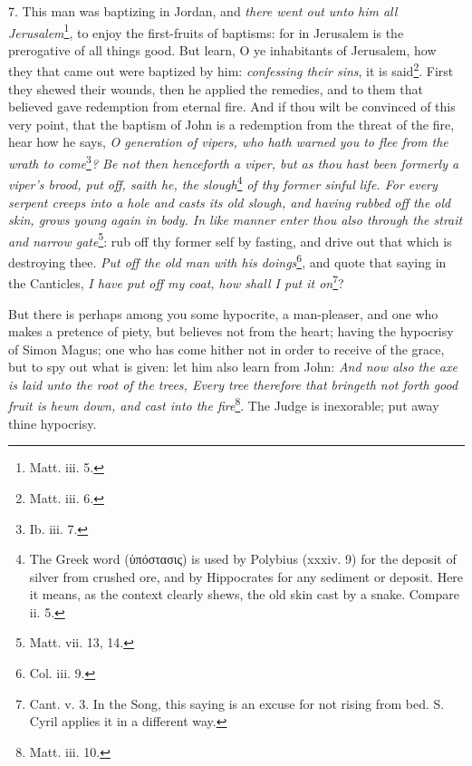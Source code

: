 7. This man was baptizing in Jordan, and \emph{there went out unto him all Jerusalem}\footnote{Matt. iii. 5.}, to enjoy the first-fruits of baptisms: for in Jerusalem is the prerogative of all things good. But learn, O ye inhabitants of Jerusalem, how they that came out were baptized by him: \emph{confessing their sins}, it is said\footnote{Matt. iii. 6.}. First they shewed their wounds, then he applied the remedies, and to them that believed gave redemption from eternal fire. And if thou wilt be convinced of this very point, that the baptism of John is a redemption from the threat of the fire, hear how he says, \emph{O generation of vipers, who hath warned you to flee from the wrath to come}\footnote{Ib. iii. 7.}\emph{? Be not then henceforth a viper, but as thou hast been formerly a viper’s brood, put off, saith he, the slough}\footnote{The Greek word (\textgreek{ὑπόστασις}) is used by Polybius (xxxiv. 9) for the deposit of silver from crushed ore, and by Hippocrates for any sediment or deposit. Here it means, as the context clearly shews, the old skin cast by a snake. Compare ii. 5.} \emph{of thy former sinful life. For every serpent creeps into a hole and casts its old slough, and having rubbed off the old skin, grows young again in body. In like manner enter thou also through the strait and narrow gate}\footnote{Matt. vii. 13, 14.}: rub off thy former self by fasting, and drive out that which is destroying thee. \emph{Put off the old man with his doings}\footnote{Col. iii. 9.}, and quote that saying in the Canticles, \emph{I have put off my coat, how shall I put it on}\footnote{Cant. v. 3. In the Song, this saying is an excuse for not rising from bed. S. Cyril applies it in a different way.}?

But there is perhaps among you some hypocrite, a man-pleaser, and one who makes a pretence of piety, but believes not from the heart; having the hypocrisy of Simon Magus; one who has come hither not in order to receive of the grace, but to spy out what is given: let him also learn from John: \emph{And now also the axe is laid unto the root of the trees, Every tree therefore that bringeth not forth good fruit is hewn down, and cast into the fire}\footnote{Matt. iii. 10.}. The Judge is inexorable; put away thine hypocrisy.

